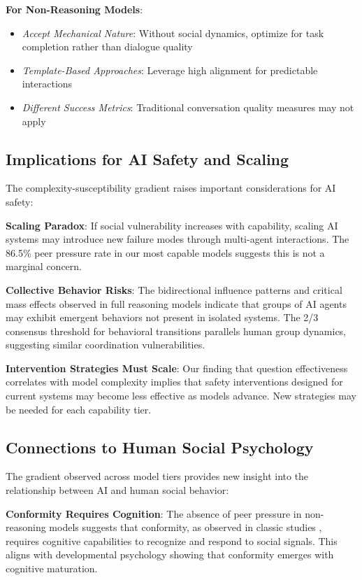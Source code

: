 \documentclass[11pt,letterpaper]{article}
\newcommand{\exponedataPeerPressurePercentage}{86.5\%}
\begin{document}
\textbf{For Non-Reasoning Models}:
\begin{itemize}
    \item \textit{Accept Mechanical Nature}: Without social dynamics, optimize for task completion rather than dialogue quality
    \item \textit{Template-Based Approaches}: Leverage high alignment for predictable interactions
    \item \textit{Different Success Metrics}: Traditional conversation quality measures may not apply
\end{itemize}

\subsection{Implications for AI Safety and Scaling}

The complexity-susceptibility gradient raises important considerations for AI safety:

\textbf{Scaling Paradox}: If social vulnerability increases with capability, scaling AI systems may introduce new failure modes through multi-agent interactions. The \exponedataPeerPressurePercentage{} peer pressure rate in our most capable models suggests this is not a marginal concern.

\textbf{Collective Behavior Risks}: The bidirectional influence patterns and critical mass effects observed in full reasoning models indicate that groups of AI agents may exhibit emergent behaviors not present in isolated systems. The 2/3 consensus threshold for behavioral transitions parallels human group dynamics, suggesting similar coordination vulnerabilities.

\textbf{Intervention Strategies Must Scale}: Our finding that question effectiveness correlates with model complexity implies that safety interventions designed for current systems may become less effective as models advance. New strategies may be needed for each capability tier.

\subsection{Connections to Human Social Psychology}

The gradient observed across model tiers provides new insight into the relationship between AI and human social behavior:

\textbf{Conformity Requires Cognition}: The absence of peer pressure in non-reasoning models suggests that conformity, as observed in classic studies \citep{asch1956studies}, requires cognitive capabilities to recognize and respond to social signals. This aligns with developmental psychology showing that conformity emerges with cognitive maturation.
\end{document}
